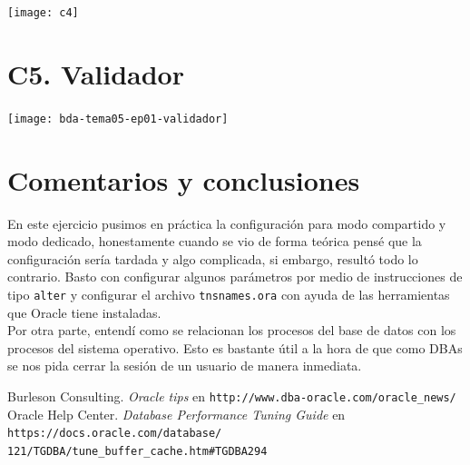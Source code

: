 \documentclass{article}
\begin{document}
\texttt{[image: c4]}

\section*{C5. Validador}

\texttt{[image: bda-tema05-ep01-validador]}

\section*{Comentarios y conclusiones}

En este ejercicio pusimos en práctica la configuración para modo compartido y
modo dedicado, honestamente cuando se vio de forma teórica pensé que la
configuración sería tardada y algo complicada, si embargo, resultó todo lo
contrario. Basto con configurar algunos parámetros por medio de instrucciones
de tipo \texttt{alter} y configurar el archivo \texttt{tnsnames.ora} con ayuda
de las herramientas que Oracle tiene instaladas.\\

Por otra parte, entendí como se relacionan los procesos del base de datos con
los procesos del sistema operativo. Esto es bastante útil a la hora de que como
DBAs se nos pida cerrar la sesión de un usuario de manera inmediata.

\begin{thebibliography}{99}
     Burleson Consulting. \textit{Oracle tips } en 
    \texttt{http://www.dba-oracle.com/oracle\_news/}
   Oracle Help Center. \textit{Database Performance Tuning 
    Guide} en \texttt{https://docs.oracle.com/database/\\%
    121/TGDBA/tune\_buffer\_cache.htm\#TGDBA294}
\end{thebibliography}
\end{document}
